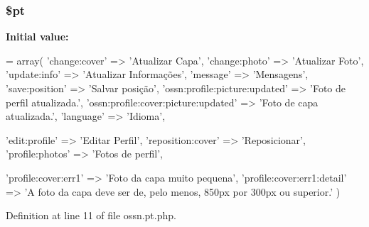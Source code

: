\subsubsection[{\texorpdfstring{\$pt}{$pt}}]{\setlength{\rightskip}{0pt plus 5cm}\$pt}\hypertarget{components_2_ossn_profile_2locale_2ossn_8pt_8php_a62c150775a7a00e8663463c638016cad}{}\label{components_2_ossn_profile_2locale_2ossn_8pt_8php_a62c150775a7a00e8663463c638016cad}
{\bfseries Initial value\+:}
\begin{DoxyCode}
= array(
        \textcolor{stringliteral}{'change:cover'} => \textcolor{stringliteral}{'Atualizar Capa'},
        \textcolor{stringliteral}{'change:photo'} => \textcolor{stringliteral}{'Atualizar Foto'},
        \textcolor{stringliteral}{'update:info'} => \textcolor{stringliteral}{'Atualizar Informações'},
        \textcolor{stringliteral}{'message'} => \textcolor{stringliteral}{'Mensagens'},
        \textcolor{stringliteral}{'save:position'} => \textcolor{stringliteral}{'Salvar posição'},
        \textcolor{stringliteral}{'ossn:profile:picture:updated'} => \textcolor{stringliteral}{'Foto de perfil atualizada.'},
        \textcolor{stringliteral}{'ossn:profile:cover:picture:updated'} => \textcolor{stringliteral}{'Foto de capa atualizada.'},
        \textcolor{stringliteral}{'language'} => \textcolor{stringliteral}{'Idioma'},
        
        \textcolor{stringliteral}{'edit:profile'} => \textcolor{stringliteral}{'Editar Perfil'},
        \textcolor{stringliteral}{'reposition:cover'} => \textcolor{stringliteral}{'Reposicionar'},
        \textcolor{stringliteral}{'profile:photos'} => \textcolor{stringliteral}{'Fotos de perfil'},
        
        \textcolor{stringliteral}{'profile:cover:err1'} => \textcolor{stringliteral}{'Foto da capa muito pequena'},
        \textcolor{stringliteral}{'profile:cover:err1:detail'} => \textcolor{stringliteral}{'A foto da capa deve ser de, pelo menos, 850px por 300px ou
       superior.'}
)
\end{DoxyCode}


Definition at line 11 of file ossn.\+pt.\+php.

